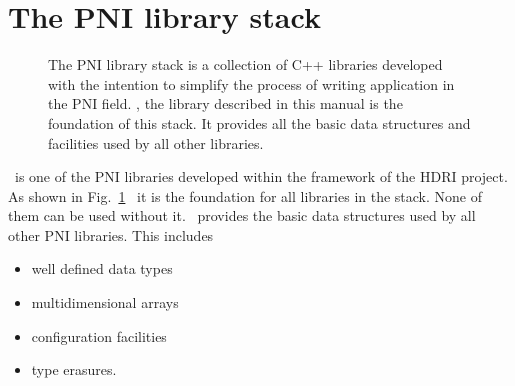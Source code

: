 

\section{The PNI library stack}

\begin{figure}[tb]
\centering
{}
\caption{{\small\label{fig:intro:libstack} 
The PNI library stack is a collection of C++ libraries developed with the
intention to simplify the process of writing application in the PNI field.
\libpnicore , the library described in this manual is the foundation of this
stack. It provides all the basic data structures and facilities used by all
other libraries.}}
\end{figure}

\libpnicore\ is one of the PNI libraries developed within the framework of the
HDRI project. As shown in Fig.~\ref{fig:intro:libstack} \libpnicore\ it is the
foundation for all libraries in the stack. None of them can be used
without it. 
\libpnicore\ provides the basic data structures used by all other PNI libraries. 
This includes
\begin{itemize}
    \item well defined data types
    \item multidimensional arrays
    \item configuration facilities 
    \item type erasures.
\end{itemize}



